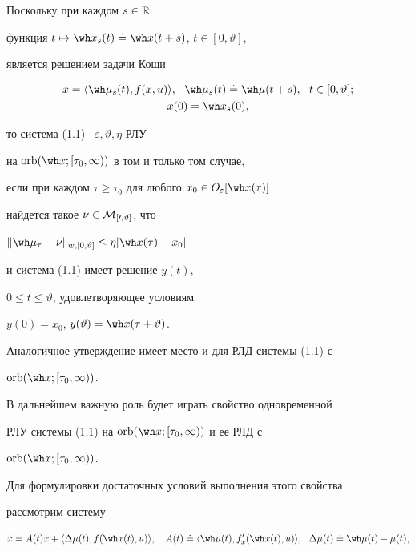 \begin{notes}


Поскольку при каждом $s\in\Bbb R$


функция $t\mapsto\wh x_{s}(t)\doteq\wh x(t+s)$, $t\in[0,\vartheta]$,


является решением задачи Коши


\begin{gather*}


\Dot x=\langle\wh\mu_{s}(t),f(x,u)\rangle,


\ \ \wh\mu_{s}(t)\doteq\wh\mu(t+s),\ \ t\in[0,\vartheta];\\


x(0)=\wh x_{s}(0), 


\end{gather*}


то система (1.1) \ $\varepsilon,\vartheta,\eta$-РЛУ


на $\orb(\wh x;[\tau_0,\infty))$ в том и только том случае,


если при каждом $\tau\ge\tau_0$ для любого $x_0


\in O_{\varepsilon}[\wh x(\tau)]$


найдется такое $\nu\in\cal M_{[0,\vartheta]}$, что


$\|\wh\mu_\tau-\nu\|_{w,[0,\vartheta]}


\le\eta|\wh x(\tau)-x_0|$


и система (1.1) имеет решение $y(t)$,


$0\le t\le\vartheta$, удовлетворяющее условиям


$y(0)=x_0$, $y(\vartheta)=\wh x(\tau+\vartheta)$.





Аналогичное утверждение имеет место и для РЛД системы (1.1) с


$\orb(\wh x;[\tau_0,\infty))$.


\end{notes}





В дальнейшем важную роль будет играть свойство одновременной


РЛУ системы (1.1) на $\orb(\wh x;[\tau_0,\infty))$ и ее РЛД с


$\orb(\wh x;[\tau_0,\infty))$.


Для формулировки достаточных условий выполнения этого свойства


рассмотрим систему


\begin{equation}


\Dot x=A(t)x+\langle\Delta\mu(t),f(\wh x(t),u)\rangle,


\quad A(t)\doteq\langle\wh\mu(t),f'_{x}(\wh x(t),u)\rangle,\ \


\Delta\mu(t)\doteq\wh\mu(t)-\mu(t),


\end{equation}


